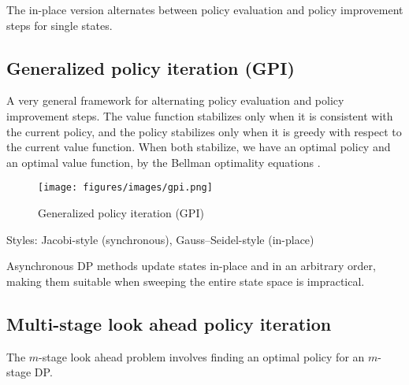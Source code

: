 The in-place version alternates between policy evaluation and policy improvement steps for single states.

\subsection{Generalized policy iteration (GPI)}

A very general framework for alternating policy evaluation and policy improvement steps.
The value function stabilizes only when it is consistent with the current policy, and the policy stabilizes only when it is greedy with respect to the current value function.
When both stabilize, we have an optimal policy and an optimal value function, by the Bellman optimality equations .

\begin{figure}[ht]
    \centering
    \texttt{[image: figures/images/gpi.png]}
    \vspace*{-0.5em}
    \caption{Generalized policy iteration (GPI)}
\end{figure}

Styles: Jacobi-style (synchronous), Gauss–Seidel-style (in-place)

Asynchronous DP methods update states in-place and in an arbitrary order, making them suitable when sweeping the entire state space is impractical.

\subsection{Multi-stage look ahead policy iteration}

The \( m \)-stage look ahead problem involves finding an optimal policy for an \( m \)-stage DP.\@
